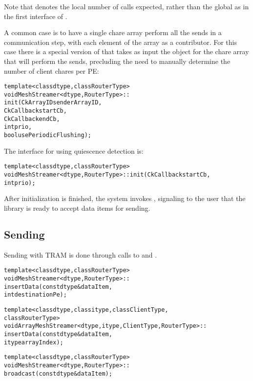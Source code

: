 Note that  denotes the local number of 
calls expected, rather than the global as in the first interface of .

A common case is to have a single chare array perform all the sends in a
communication step, with each element of the array as a contributor. For this
case there is a special version of  that takes as input the
 object for the chare array that will perform the sends,
precluding the need to manually determine the number of client chares per PE:

\begin{alltt}
template <class dtype, class RouterType>
void MeshStreamer<dtype, RouterType>::
init(CkArrayID senderArrayID,
     CkCallback startCb,
     CkCallback endCb,
     int prio,
     bool usePeriodicFlushing);
\end{alltt}

The  interface for using quiescence detection is:

\begin{alltt}
template <class dtype, class RouterType>
void MeshStreamer<dtype, RouterType>::init(CkCallback startCb,
                                           int prio);
\end{alltt}

After initialization is finished, the system invokes ,
signaling to the user that the library is ready to accept data items
for sending.
\\


\subsection{Sending}

Sending with TRAM is done through calls to  and
.

\begin{alltt}
template <class dtype, class RouterType>
void MeshStreamer<dtype, RouterType>::
insertData(const dtype& dataItem,
           int destinationPe);

template <class dtype, class itype, class ClientType,
          class RouterType>
void ArrayMeshStreamer<dtype, itype, ClientType, RouterType>::
insertData(const dtype& dataItem,
           itype arrayIndex);

template <class dtype, class RouterType>
void MeshStreamer<dtype, RouterType>::
broadcast(const dtype& dataItem);
\end{alltt}

